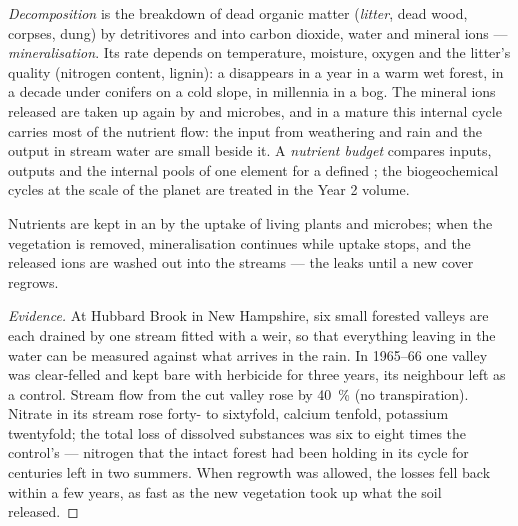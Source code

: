 \begin{definition}\label{def:b1:ecosystem-dynamics:decomposition}
\emph{Decomposition} is the breakdown of dead organic matter
(\emph{litter}, dead wood, corpses, dung) by detritivores and
 into carbon dioxide, water and mineral ions ---
\emph{mineralisation}. Its rate depends on temperature, moisture,
oxygen and the litter's quality (nitrogen content, lignin): a 
disappears in a year in a warm wet forest, in a decade under conifers
on a cold slope, in millennia in a bog. The mineral ions released
are taken up again by  and microbes, and in a mature 
this internal cycle carries most of the nutrient flow: the input from
weathering and rain and the output in stream water are small beside
it. A \emph{nutrient budget} compares inputs, outputs and the internal
pools of one element for a defined ; the biogeochemical
cycles at the scale of the planet are treated in the Year 2 volume.
\end{definition}

\begin{proposition}\label{prop:b1:ecosystem-dynamics:retention}
Nutrients are kept in an  by the uptake of living plants and
microbes; when the vegetation is removed, mineralisation continues
while uptake stops, and the released ions are washed out into the
streams --- the  leaks until a new cover regrows.
\end{proposition}
\begin{proof}[Evidence]
At Hubbard Brook in New Hampshire, six small forested valleys are
each drained by one stream fitted with a weir, so that everything
leaving in the water can be measured against what arrives in the
rain. In 1965--66 one valley was clear-felled and kept bare with
herbicide for three years, its neighbour left as a control. Stream
flow from the cut valley rose by \qty{40}{\%} (no transpiration).
Nitrate in its stream rose forty- to sixtyfold, calcium tenfold,
potassium twentyfold; the total loss of dissolved substances was six
to eight times the control's --- nitrogen that the intact forest had
been holding in its cycle for centuries left in two summers. When
regrowth was allowed, the losses fell back within a few years, as
fast as the new vegetation took up what the soil released.
\end{proof}

